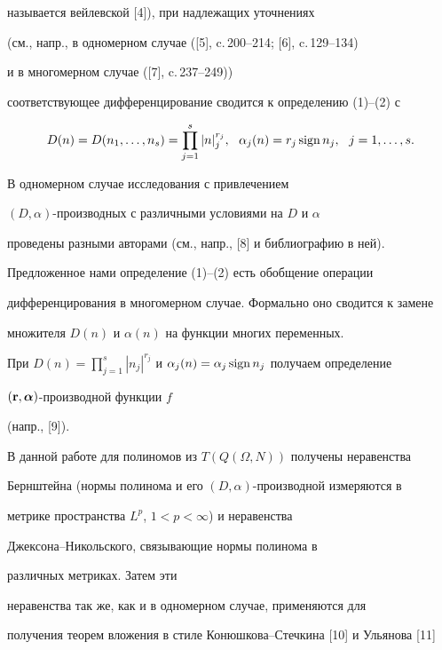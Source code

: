 называется вейлевской [4]), при надлежащих уточнениях


(см., напр., в одномерном случае ([5], c.\,200--214; [6], c.\,129--134)


и в многомерном случае ([7], c.\,237--249))


соответствующее дифференцирование сводится к определению (1)--(2) с


$$


D(n)=D(n_1,\dotsc,n_s)=\prod_{j=1}^s |n|_j^{r_j},\ \ {\alpha}_{j}


(n)= {r_j} \sign {n_j}, \ \ j=1,\dotsc,s.


$$





В одномерном случае исследования с привлечением 


$(D,\alpha)$-производных с различными условиями на $D$ и $\alpha$


проведены разными авторами (см., напр., [8] и библиографию в ней).





Предложенное нами определение (1)--(2) есть обобщение операции 


дифференцирования в многомерном случае. Формально оно сводится к замене 


множителя $D(n)$ и $\alpha(n)$ на функции многих переменных. 


При $D(n)=\prod\limits_{j=1}^s |n_j|^{r_j}$ и ${\alpha}_{j}(n)= 


{{\alpha}_j} \sign {n_j}$ получаем определение 


$({\bold r},{\boldsymbol{\alpha}})$-производной функции $f$ 


(напр., [9]).





В данной работе для полиномов из $T(Q(\Omega,N))$ получены неравенства 


Бернштейна (нормы полинома и его $(D,\alpha)$-производной измеряются в 


метрике пространства $L^p$, $1<p<\infty$) и неравенства 


Джексона--Никольского, связывающие нормы полинома в 


различных метриках. Затем эти 


неравенства так же, как и в одномерном случае, применяются для 


получения теорем вложения в стиле Конюшкова--Стечкина [10] и Ульянова [11] 


